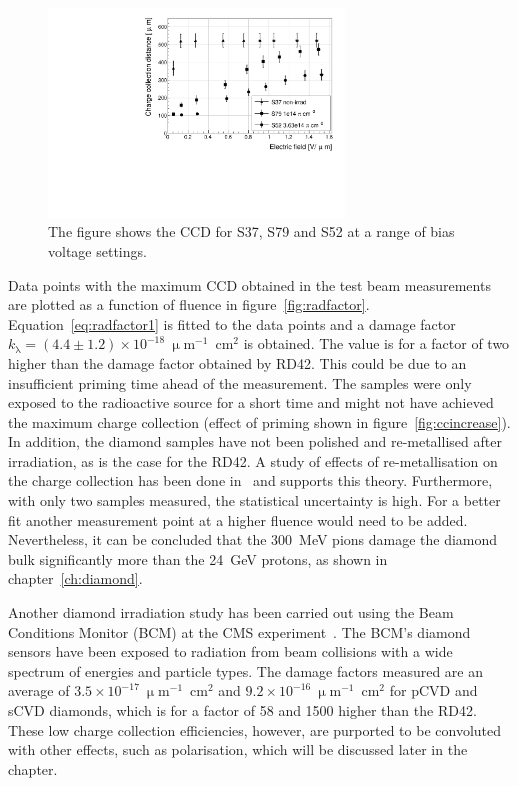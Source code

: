 \begin{figure}[!t]
\begin{center}
\includegraphics[width=0.7\textwidth]{03_measurement_results/scripts/plots/ccd}
\caption{The figure shows the CCD for S37, S79 and S52 at a range of bias voltage settings.}
\label{fig:ccd}
\end{center}
\end{figure}

Data points with the maximum CCD obtained in the test beam measurements are plotted as a function of fluence in figure~\ref{fig:radfactor}. Equation~\ref{eq:radfactor1} is fitted to the data points and a damage factor $k_{\mathrm{\lambda}}=(4.4\pm1.2)\times10^{-18}~\upmu$m$^{-1}$~cm$^{2}$ is obtained. The value is for a factor of two higher than the damage factor obtained by RD42. %
This could be due to an insufficient priming time ahead of the measurement. The samples were only exposed to the radioactive source for a short time and might not have achieved the maximum charge collection (effect of priming shown in figure~\ref{fig:ccincrease}). In addition, the diamond samples have not been polished and re-metallised after irradiation, as is the case for the RD42. A study of effects of re-metallisation on the charge collection has been done in~\cite{pomorski2008electronic} and supports this theory. Furthermore, with only two samples measured, the statistical uncertainty is high. For a better fit another measurement point at a higher fluence would need to be added. Nevertheless, it can be concluded that the 300~MeV pions damage the diamond bulk significantly more than the 24~GeV protons, as shown in chapter~\ref{ch:diamond}.

Another diamond irradiation study has been carried out using the Beam Conditions Monitor (BCM) at the CMS experiment~\cite{Guthoff:1977429}. The BCM's diamond sensors have been exposed to radiation from beam collisions with a wide spectrum of energies and particle types. The damage factors measured are an average of $3.5\times10^{-17}~\upmu$m$^{-1}$~cm$^{2}$ and $9.2\times10^{-16}~\upmu$m$^{-1}$~cm$^{2}$ for pCVD and sCVD diamonds, which is for a factor of 58 and 1500 higher than the RD42. These low charge collection efficiencies, however, are purported to be convoluted with other effects, such as polarisation, which will be discussed later in the chapter.


